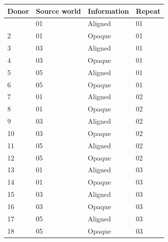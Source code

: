 \documentclass[10pt,a4paper]{article}
\begin{document}
{\def\LTcaptype{table} %
\small\begin{longtable}[]{@{}llll@{}}
\toprule\noalign{}
Donor & Source world & Information & Repeat \\
\midrule\noalign{}
\endhead
\bottomrule\noalign{}
\endlastfoot
1 & 01 & Aligned & 01 \\
2 & 01 & Opaque & 01 \\
3 & 03 & Aligned & 01 \\
4 & 03 & Opaque & 01 \\
5 & 05 & Aligned & 01 \\
6 & 05 & Opaque & 01 \\
7 & 01 & Aligned & 02 \\
8 & 01 & Opaque & 02 \\
9 & 03 & Aligned & 02 \\
10 & 03 & Opaque & 02 \\
11 & 05 & Aligned & 02 \\
12 & 05 & Opaque & 02 \\
13 & 01 & Aligned & 03 \\
14 & 01 & Opaque & 03 \\
15 & 03 & Aligned & 03 \\
16 & 03 & Opaque & 03 \\
17 & 05 & Aligned & 03 \\
18 & 05 & Opaque & 03 \\
\end{longtable}\normalsize
}
\end{document}
